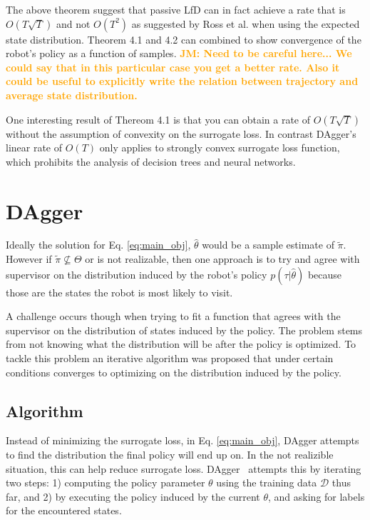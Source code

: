 \documentclass[10pt, conference]{ieeeconf}      %
\newcommand{\jmnote}[1]{%
 {\textcolor{orange}{\textbf{JM: #1}}}{}}
\begin{document}
 The above theorem suggest that passive LfD can in fact achieve a rate that is $O(T\sqrt{T})$ and not $O(T^2)$ as suggested by Ross et al. \cite{ross2010reduction,ross2010efficient} when using the expected state distribution. Theorem 4.1 and 4.2 can combined to show convergence of the robot's policy as a function of samples. 
 \jmnote{Need to be careful here... We could say that in this particular case you get a better rate. Also it could be useful to explicitly write the relation between trajectory and average state distribution.}
 
 

One interesting result of Thereom 4.1 is that you can obtain a rate of $O(T\sqrt{T})$ without the assumption of convexity on the surrogate loss. In contrast DAgger's linear rate of $O(T)$ only applies to strongly convex surrogate loss function, which prohibits the analysis of decision trees and neural networks. 

\section{DAgger}\label{sec:DAgger}
Ideally the solution for Eq. \ref{eq:main_obj}, $\hat{\theta}$ would be a sample estimate of $\tilde{\pi}$. However if $\tilde{\pi} \nsubseteq \Theta$ or is not realizable, then one approach is to try and agree with supervisor on the distribution induced by the robot's policy $p(\tau|\hat{\theta})$ because those are the states the robot is most likely to visit. 

A challenge occurs though when trying to fit a function that agrees with the supervisor on the distribution of states induced by the policy. The problem stems from not knowing what the distribution will be after the policy is optimized. To tackle this problem an iterative algorithm was proposed that under certain conditions converges to optimizing on the distribution induced by the policy. 


 \subsection{Algorithm}
Instead of  minimizing the surrogate loss, in Eq. \ref{eq:main_obj},  DAgger attempts to find the distribution the final policy will end up on. In the not realizible situation, this can help reduce surrogate loss. 
DAgger~\cite{ross2010reduction} attempts this by iterating two steps: 1)
computing the policy parameter $\theta$ using the training data $\mathcal{D}$ thus far, and 2) by executing the policy
induced by the current $\theta$, and asking for labels for the encountered states. 
 
\end{document}
